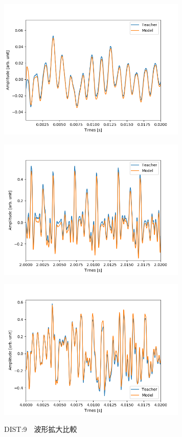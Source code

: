 \documentclass{jreport}		%
\begin{document}
\begin{figure}[htbp]
\begin{minipage}{0.5\hsize}
\begin{center}
 \end{center}
 \label{fig:one}
 \end{minipage}
 \begin{minipage}{0.5\hsize}
 \begin{center}
  \includegraphics[width=90mm]{gain10_output_hikaku4.png}
 \end{center}
 \label{fig:two}
 \end{minipage}
 \begin{minipage}{0.5\hsize}
 \begin{center}
  \includegraphics[width=90mm]{gain10_output_hikaku5.png}
 \end{center}
 \label{fig:one}
 \end{minipage}
 \begin{minipage}{0.5\hsize}
 \begin{center}
  \includegraphics[width=90mm]{gain10_output_hikaku6.png}
 \end{center}
 \label{fig:two}
 \end{minipage}
 \caption{DIST:9　波形拡大比較}
\end{figure}
\end{document}
